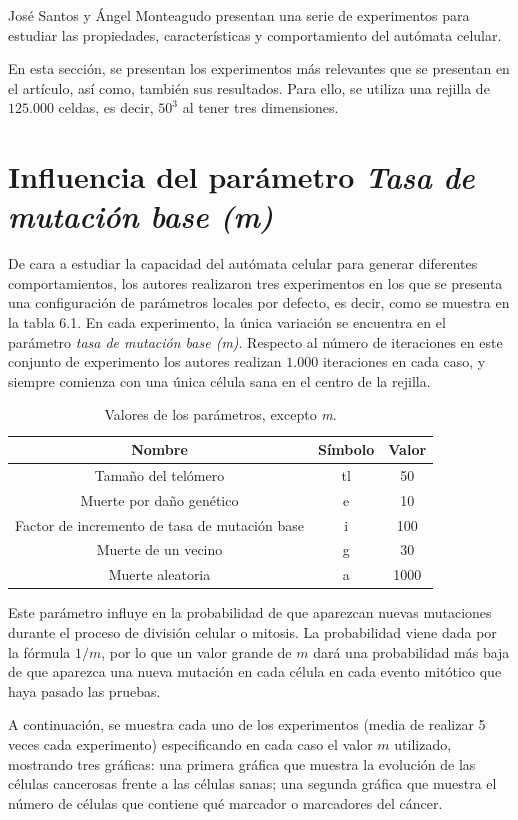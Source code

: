 José Santos y Ángel Monteagudo presentan una serie de experimentos para estudiar
las propiedades, características y comportamiento del autómata celular.

En esta sección, se presentan los experimentos más relevantes que se presentan
en el artículo, así como, también sus resultados. Para ello, se utiliza una rejilla
de $125.000$ celdas, es decir, $50^3$ al tener tres dimensiones.

\section{Influencia del parámetro \textit{Tasa de mutación base (m)}}

De cara a estudiar la capacidad del autómata celular para generar diferentes comportamientos,
los autores realizaron tres experimentos en los que se presenta una configuración de parámetros
locales por defecto, es decir, como se muestra en la tabla 6.1. En cada experimento, la
única variación se encuentra en el parámetro \textit{tasa de mutación base (m)}. Respecto al
número de iteraciones en este conjunto de experimento los autores realizan $1.000$ iteraciones en
cada caso, y siempre comienza con una única célula sana en el centro de la rejilla.

\begin{table}[h!]
  \centering
  \caption{Valores de los parámetros, excepto \textit{m}.}
  \label{tab:table1}
  \begin{tabular}{ccc}
    \toprule
    Nombre & Símbolo & Valor\\
    \midrule
    Tamaño del telómero & tl & 50\\
    Muerte por daño genético & e & 10\\
    Factor de incremento de tasa de mutación base & i & 100\\
    Muerte de un vecino & g & 30\\
    Muerte aleatoria & a & 1000\\
    \bottomrule
  \end{tabular}
\end{table}

Este parámetro influye en la probabilidad de que aparezcan nuevas mutaciones durante
el proceso de división celular o mitosis. La probabilidad viene dada por la fórmula
$1/m$, por lo que un valor grande de $m$ dará una probabilidad más baja de que
aparezca una nueva mutación en cada célula en cada evento mitótico que haya pasado
las pruebas.

A continuación, se muestra cada uno de los experimentos (media de realizar 5 veces cada experimento) especificando en cada caso
el valor $m$ utilizado, mostrando tres gráficas: una primera gráfica que muestra la
evolución de las células cancerosas frente a las células sanas; una segunda gráfica que
muestra el número de células que contiene qué marcador o marcadores del cáncer.

